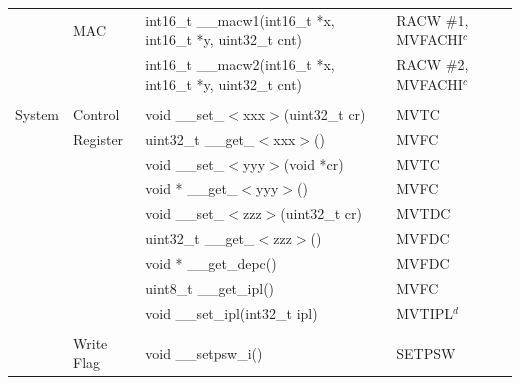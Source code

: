 \begin{table}
\begin{center}
\begin{tabular}{llll}
                  & MAC               & int16\_t \_\_macw1(int16\_t *x, int16\_t *y, uint32\_t cnt)                  & RACW \#1, MVFACHI$^c$    \\
                  &                   & int16\_t \_\_macw2(int16\_t *x, int16\_t *y, uint32\_t cnt)                  & RACW \#2, MVFACHI$^c$    \\
                  &                   &                                                                              &                          \\
System            & Control           & void \_\_set\_$<$xxx$>$(uint32\_t cr)                                        & MVTC                     \\
                  & Register          & uint32\_t \_\_get\_$<$xxx$>$()                                               & MVFC                     \\
                  &                   & void \_\_set\_$<$yyy$>$(void *cr)                                            & MVTC                     \\
                  &                   & void * \_\_get\_$<$yyy$>$()                                                  & MVFC                     \\
                  &                   & void \_\_set\_$<$zzz$>$(uint32\_t cr)                                        & MVTDC                    \\
                  &                   & uint32\_t \_\_get\_$<$zzz$>$()                                               & MVFDC                    \\
                  &                   & void * \_\_get\_depc()                                                       & MVFDC                    \\
                  &                   & uint8\_t \_\_get\_ipl()                                                      & MVFC                     \\
                  &                   & void \_\_set\_ipl(int32\_t ipl)                                              & MVTIPL$^d$               \\
                  &                   &                                                                              &                          \\
                  & Write Flag        & void \_\_setpsw\_i()                                                         & SETPSW                   \\

\end{tabular}
\end{center}
\end{table}
